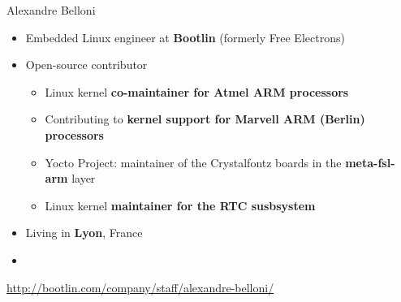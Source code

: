 \begin{frame}{Alexandre Belloni}
    \begin{itemize}
      \item Embedded Linux engineer at {\bf Bootlin} (formerly Free
            Electrons)
      \item Open-source contributor
        \begin{itemize}
          \item Linux kernel {\bf co-maintainer for Atmel ARM
            processors}
          \item Contributing to {\bf kernel support for Marvell
            ARM (Berlin) processors}
          \item Yocto Project: maintainer of the Crystalfontz boards
            in the {\bf meta-fsl-arm} layer
          \item Linux kernel {\bf maintainer for the RTC susbsystem}
        \end{itemize}
      \item Living in {\bf Lyon}, France
      \item {}
    \end{itemize}
    {\small \url{http://bootlin.com/company/staff/alexandre-belloni/}}
\end{frame}

